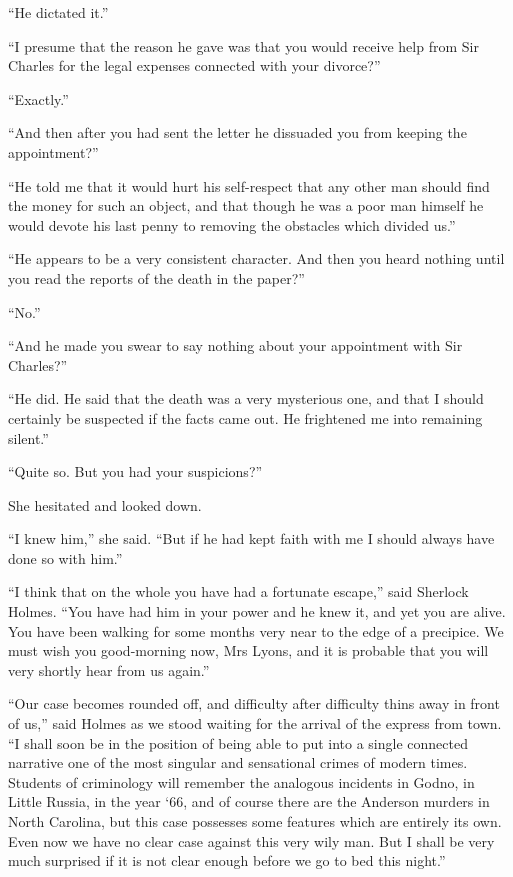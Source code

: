 \documentclass[paper=5.5in:8.5in,BCOR=7mm,twoside,DIV=calc,12pt,usegeometry,openany,chapterprefix,endperiod]{scrbook} %
\begin{document}
\enquote{He dictated it.}

\enquote{I presume that the reason he gave was that you would receive help from Sir Charles for the legal expenses connected with your divorce?}

\enquote{Exactly.}

\enquote{And then after you had sent the letter he dissuaded you from keeping the appointment?}

\enquote{He told me that it would hurt his self-respect that any other man should find the money for such an object, and that though he was a poor man himself he would devote his last penny to removing the obstacles which divided us.}

\enquote{He appears to be a very consistent character. And then you heard nothing until you read the reports of the death in the paper?}

\enquote{No.}

\enquote{And he made you swear to say nothing about your appointment with Sir Charles?}

\enquote{He did. He said that the death was a very mysterious one, and that I should certainly be suspected if the facts came out. He frightened me into remaining silent.}

\enquote{Quite so. But you had your suspicions?}

She hesitated and looked down.

\enquote{I knew him,} she said. \enquote{But if he had kept faith with me I should always have done so with him.}

\enquote{I think that on the whole you have had a fortunate escape,} said Sherlock Holmes. \enquote{You have had him in your power and he knew it, and yet you are alive. You have been walking for some months very near to the edge of a precipice. We must wish you good-morning now, Mrs Lyons, and it is probable that you will very shortly hear from us again.}

\enquote{Our case becomes rounded off, and difficulty after difficulty thins away in front of us,} said Holmes as we stood waiting for the arrival of the express from town. \enquote{I shall soon be in the position of being able to put into a single connected narrative one of the most singular and sensational crimes of modern times. Students of criminology will remember the analogous incidents in Godno, in Little Russia, in the year `66, and of course there are the Anderson murders in North Carolina, but this case possesses some features which are entirely its own. Even now we have no clear case against this very wily man. But I shall be very much surprised if it is not clear enough before we go to bed this night.}
\end{document}
